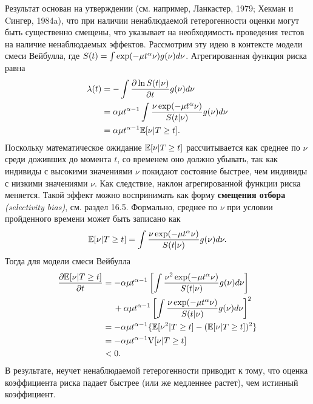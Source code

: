 Результат основан на утверждении (см. например, Ланкастер, 1979; Хекман и Cингер, 1984a), что при наличии ненаблюдаемой гетерогенности оценки могут быть существенно смещены, что указывает на необходимость проведения тестов на наличие ненаблюдаемых эффектов. Рассмотрим эту идею в контексте модели смеси Вейбулла, где $S(t) = \int \exp(-\mu t^{\alpha}\nu) g(\nu) d\nu$. Агрегированная функция риска равна
    \begin{align}
        \lambda(t) &= -\int\frac{\partial \ln S(t|\nu)}{\partial t} g(\nu) d\nu \notag\\
               &= \alpha\mu t^{\alpha-1} \int \frac{\nu\exp(-\mu t^{\alpha}\nu)}{S(t|\nu)} g(\nu) d\nu \notag \\
               &= \alpha\mu t^{\alpha-1} \mathbb{E}[\nu|T\ge t]. \notag
    \end{align}
Поскольку математическое ожидание $\mathbb{E}[\nu|T\ge t]$ рассчитывается как среднее по $\nu$ среди доживших до момента $t$, со временем оно должно убывать, так как индивиды с высокими значениями $\nu$ покидают состояние быстрее, чем индивиды с низкими значениями $\nu$. Как следствие, наклон агрегированной функции риска меняется. Такой эффект можно воспринимать как форму \textbf{смещения отбора} \textit{(selectivity bias)}, %
см. раздел 16.5. %
Формально, среднее по $\nu$ при условии пройденного времени может быть записано как
    $$\mathbb{E}[\nu|T\ge t] = \int\frac{\nu\exp(-\mu t^\alpha\nu)}{S(t|\nu)} g(\nu) d\nu.$$
Тогда для модели смеси Вейбулла
    \begin{align}
    \label{eq:18.15}
        \frac{\partial\mathbb{E}[\nu|T\ge t]}{\partial t} &= -\alpha\mu t^{\alpha-1} \left[ \int\frac{\nu^2\exp(-\mu t^\alpha\nu)}{S(t|\nu)} g(\nu) d\nu \right] \notag\\
                                        &\hspace{0.43cm} +\alpha\mu t^{\alpha-1} \left[ \int\frac{\nu\exp(-\mu t^\alpha\nu)}{S(t|\nu)} g(\nu) d\nu \right]^2 \notag \\
                                        &= -\alpha\mu t^{\alpha-1} \{\mathbb{E}[\nu^2|T\ge t] - (\mathbb{E}[\nu|T\ge t])^2 \} \notag\\
                                        &= -\alpha\mu t^{\alpha-1} \mathrm{V}[\nu|T\ge t] \\
                                        &< 0. \notag
    \end{align}
В результате, неучет ненаблюдаемой гетерогенности приводит к тому, что оценка коэффициента риска падает быстрее (или же медленнее растет), чем истинный коэффициент.

